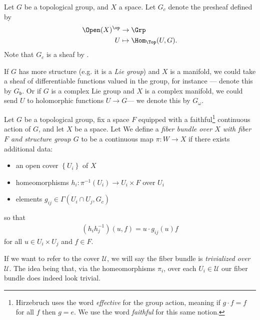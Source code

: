 \documentclass[11pt]{amsart}
\begin{document}
\begin{notation} 
\label{nota:Gc}
Let $G$ be a topological group, and $X$ a space. Let $G_c$ denote the presheaf defined by
\begin{align*}
    \Open(X)^\op &\to \Grp \\
    U &\mapsto \Hom_{\Top}(U,G).
\end{align*}
Note that $G_c$ is a sheaf by .

If $G$ has more structure (e.g. it is a \emph{Lie group}) and $X$ is a manifold, we could take a sheaf of differentiable functions valued in the group, for instance --- denote this by $G_\mathfrak{b}$. Or if $G$ is a complex Lie group and $X$ is a complex manifold, we could send $U$ to holomorphic functions $U \to G$--- we denote this by $G_\omega$.
\end{notation}

\begin{definition}\label{def:fiber-bundle} 
Let $G$ be a topological group, fix a space $F$ equipped with a faithful\footnote{Hirzebruch uses the word \emph{effective} for the group action, meaning if $g\cdot f = f$ for all $f$ then $g=e$. We use the word \emph{faithful} for this same notion.} continuous action of $G$, and let $X$ be a space. Let  We define a \emph{fiber bundle over $X$ with fiber $F$ and structure group $G$} to be a continuous map $\pi \colon W \to X$ if there exists additional data:
\begin{itemize}
    \item an open cover $\left\{ U_i \right\}$ of $X$
    \item homeomorphisms $h_i \colon \pi^{-1}(U_i) \to U_i \times F$ over $U_i$
    \item elements $g_{ij} \in \Gamma(U_i\cap U_j, G_c)$
\end{itemize}
so that
\begin{align*}
    (h_i h_j^{-1})(u,f) = u\cdot g_{ij}(u)f
\end{align*}
for all $u \in U_i \times U_j$ and $f\in F$.
\end{definition}

\begin{terminology} If we want to refer to the cover $\mathcal{U}$, we will say the fiber bundle is \emph{trivialized over $\mathcal{U}$}. The idea being that, via the homeomorphisms $\pi_i$, over each $U_i \in \mathcal{U}$ our fiber bundle does indeed look trivial.
\end{terminology}
\end{document}

